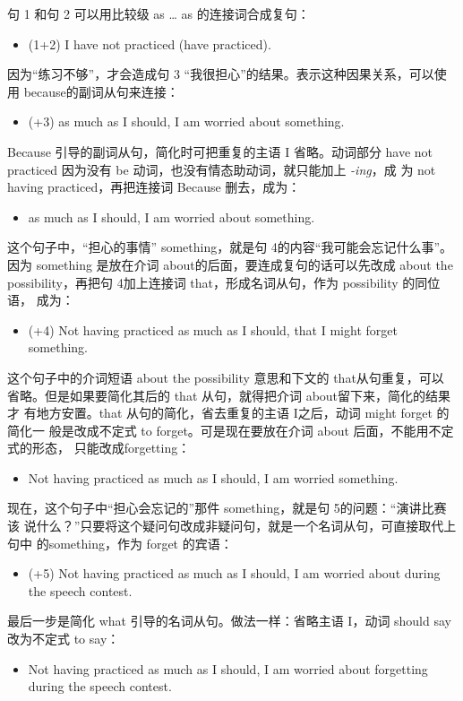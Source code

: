 句 1 和句 2 可以用比较级 as \ldots{} as 的连接词合成复句：
\begin{itemize}
\item (1+2) I have not practiced  (have practiced).
\end{itemize}
因为“练习不够”，才会造成句 3 “我很担心”的结果。表示这种因果关系，可以使
用 because的副词从句来连接：
\begin{itemize}
\item (+3)  as much as I should, I am
  worried about something.
\end{itemize}
Because 引导的副词从句，简化时可把重复的主语 I 省略。动词部分 have not
practiced 因为没有 be 动词，也没有情态助动词，就只能加上 \emph{-ing}，成
为 not having practiced，再把连接词 Because 删去，成为：
\begin{itemize}
\item {} as much as I should, I am worried about something.
\end{itemize}
这个句子中，“担心的事情” something，就是句 4的内容“我可能会忘记什么事”。
因为 something 是放在介词 about的后面，要连成复句的话可以先改成 about the
possibility，再把句 4加上连接词 that，形成名词从句，作为 possibility 的同位语，
成为：
\begin{itemize}
\item (+4) Not having practiced as much as I should,  that I might forget something.
\end{itemize}
这个句子中的介词短语 about the possibility 意思和下文的 that从句重复，可以
省略。但是如果要简化其后的 that 从句，就得把介词 about留下来，简化的结果才
有地方安置。that 从句的简化，省去重复的主语 I之后，动词 might forget 的简化一
般是改成不定式 to forget。可是现在要放在介词 about 后面，不能用不定式的形态，
只能改成forgetting：
\begin{itemize}
\item Not having practiced as much as I should, I am worried 
  something.
\end{itemize}
现在，这个句子中“担心会忘记的”那件 something，就是句 5的问题：“演讲比赛该
说什么？”只要将这个疑问句改成非疑问句，就是一个名词从句，可直接取代上句中
的something，作为 forget 的宾语：
\begin{itemize}
\item (+5) Not having practiced as much as I should, I am worried about
   during the speech contest.
\end{itemize}
最后一步是简化 what 引导的名词从句。做法一样：省略主语 I，动词 should
say 改为不定式 to say：
\begin{itemize}
\item Not having practiced as much as I should, I am worried about forgetting
   during the speech contest.
\end{itemize}

